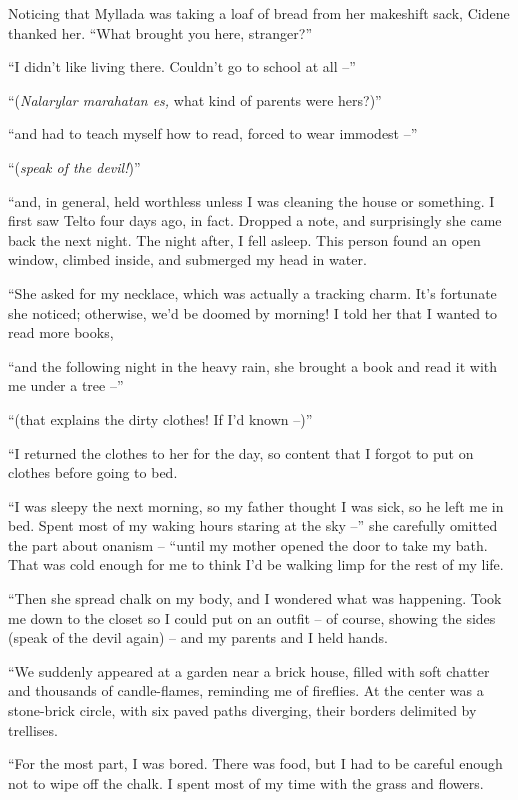 Noticing that Myllada was taking a loaf of bread from her makeshift sack, Cidene thanked her. ``What brought you here, stranger?''

``I didn't like living there. Couldn't go to school at all --''

``(\emph{Nalarylar marahatan es,} what kind of parents were hers?)''

``and had to teach myself how to read, forced to wear immodest --''

``(\emph{speak of the devil!})''

``and, in general, held worthless unless I was cleaning the house or something. I first saw Telto four days ago, in fact. Dropped a note, and surprisingly she came back the next night. The night after, I fell asleep. This person found an open window, climbed inside, and submerged my head in water.

``She asked for my necklace, which was actually a tracking charm. It's fortunate she noticed; otherwise, we'd be doomed by morning! I told her that I wanted to read more books,

``and the following night in the heavy rain, she brought a book and read it with me under a tree --''

``(that explains the dirty clothes! If I'd known --)''

``I returned the clothes to her for the day, so content that I forgot to put on clothes before going to bed.

``I was sleepy the next morning, so my father thought I was sick, so he left me in bed. Spent most of my waking hours staring at the sky --'' she carefully omitted the part about onanism -- ``until my mother opened the door to take my bath. That was cold enough for me to think I'd be walking limp for the rest of my life.

``Then she spread chalk on my body, and I wondered what was happening. Took me down to the closet so I could put on an outfit -- of course, showing the sides (speak of the devil again) -- and my parents and I held hands.

``We suddenly appeared at a garden near a brick house, filled with soft chatter and thousands of candle-flames, reminding me of fireflies. At the center was a stone-brick circle, with six paved paths diverging, their borders delimited by trellises.

``For the most part, I was bored. There was food, but I had to be careful enough not to wipe off the chalk. I spent most of my time with the grass and flowers.

